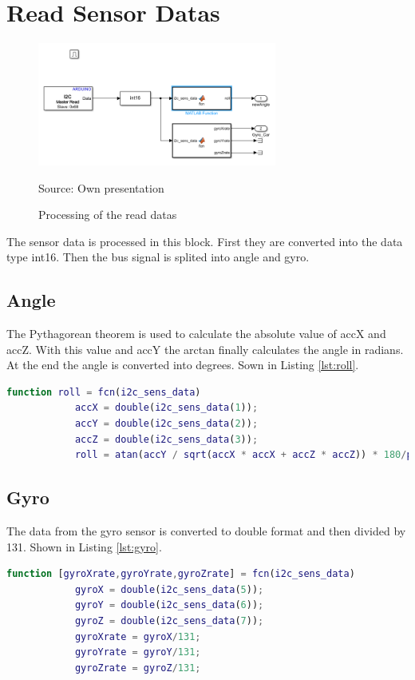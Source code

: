 	
\section{Read Sensor Datas}\label{sec:read}
	\begin{figure}[!htbp]
		\centering
		\includegraphics[width=0.7\textwidth]{figures/read.PNG}
		\caption{Processing of the read datas}	
		Source: Own presentation	
		\label{fig:read}	
	\end{figure}
The sensor data is processed in this block. First they are converted into the data type int16. 
Then the bus signal is splited into angle and gyro.
	\subsection{Angle}
	The Pythagorean theorem is used to calculate the absolute value of accX and accZ. With this value and accY the arctan finally calculates the angle in radians. At the end the angle is converted into degrees. Sown in Listing \ref{lst:roll}.
		\begin{mdframed}
			\begin{lstlisting}[caption={Conversion from the acceleration to the angle}, language=matlab,label={lst:roll}]
			function roll = fcn(i2c_sens_data)
			accX = double(i2c_sens_data(1));
			accY = double(i2c_sens_data(2));
			accZ = double(i2c_sens_data(3));
			roll = atan(accY / sqrt(accX * accX + accZ * accZ)) * 180/pi;		
			\end{lstlisting}
		\end{mdframed}
	
	\subsection{Gyro}
	The data from the gyro sensor is converted to double format and then divided by 131. Shown in Listing \ref{lst:gyro}.
		\begin{mdframed}
			\begin{lstlisting}[caption={Conversion to the gyros}, language=matlab,label={lst:gyro}]
			function [gyroXrate,gyroYrate,gyroZrate] = fcn(i2c_sens_data)
			gyroX = double(i2c_sens_data(5));
			gyroY = double(i2c_sens_data(6));
			gyroZ = double(i2c_sens_data(7));
			gyroXrate = gyroX/131;
			gyroYrate = gyroY/131;
			gyroZrate = gyroZ/131;	
			\end{lstlisting}
		\end{mdframed}
	
